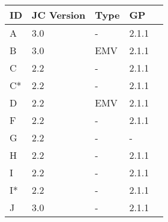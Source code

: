     \centering
    \begin{tabular}{@{}lllll@{}}
        \toprule
        \textbf{ID} & \textbf{JC Version} & \textbf{Type} & \textbf{GP\footnotemark} \\
        \midrule
        A   & 3.0                & -                & 2.1.1 \\
        B   & 3.0                & EMV              & 2.1.1 \\
        C   & 2.2                & -                & 2.1.1 \\
        C*   & 2.2                & -                & 2.1.1 \\
        D   & 2.2                & EMV              & 2.1.1 \\
        F   & 2.2                & -                & 2.1.1 \\
        G   & 2.2                & -                & -     \\
        H   & 2.2                & -                & 2.1.1 \\
        I   & 2.2                & -                & 2.1.1 \\
        I*   & 2.2                & -                & 2.1.1 \\
        J   & 3.0                & -                & 2.1.1 \\
        \bottomrule
    \end{tabular}
    \caption{%
        List of the cards, that undergone the analysis. The star next to the card ID denotes a different physical card of the same type.
        \label{tab:card-list}
    }
